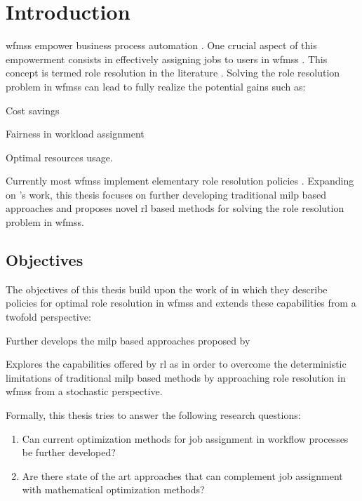 \chapter{Introduction}
\label{ch:intro}

\glspl{wfms} empower business process automation \citep{Zeng2005}. One crucial aspect of this empowerment consists in effectively assigning jobs to users in \glspl{wfms} \citep{Zeng2005}. This concept is termed role resolution in the literature \citep{Cheng2000}. Solving the role resolution problem in \glspl{wfms} can lead to fully realize the potential gains such as:
\begin{enumerate*}
	\item Cost savings
	\item Fairness in workload assignment
	\item Optimal resources usage.
\end{enumerate*}

Currently most \glspl{wfms} implement elementary role resolution policies \citep{Zeng2005}. Expanding on \citet{Zeng2005}'s work, this thesis focuses on further developing traditional \gls{milp} based approaches and proposes novel \gls{rl} based methods for solving the role resolution problem in \glspl{wfms}.


\section{Objectives}
\label{sec:objectives}

The objectives of this thesis build upon the work of \citet{Zeng2005} in which they describe policies for optimal role resolution in \glspl{wfms} and extends these capabilities from a twofold perspective:
\begin{enumerate*}
	\item Further develops the \gls{milp} based approaches proposed by \citet{Zeng2005}
	\item Explores the capabilities offered by \gls{rl} as in order to overcome the deterministic limitations of traditional \gls{milp} based methods by approaching role resolution in \glspl{wfms} from a stochastic perspective.
\end{enumerate*}

Formally, this thesis tries to answer the following research questions:

\begin{enumerate}[label=\textbf{Q. \Roman*},ref=Research Question \Roman*]
\item Can current optimization methods for job assignment in workflow processes be further developed? \label{rq:one}
\item Are there state of the art approaches that can complement job assignment with mathematical optimization methods? \label{rq:two}
\end{enumerate}

